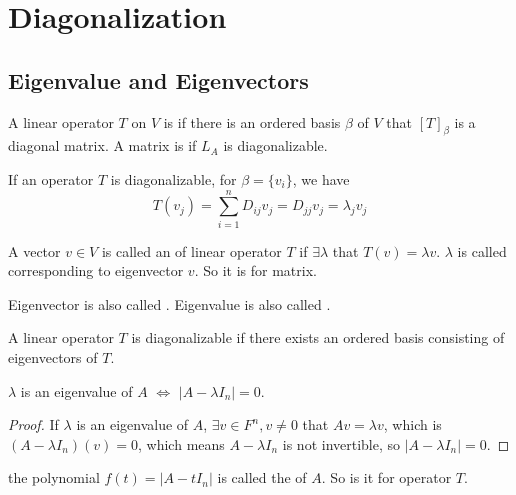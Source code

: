 \section{Diagonalization}

\subsection{Eigenvalue and Eigenvectors}

\begin{definition}
    A linear operator $T$ on $V$ is  if there is an ordered basis $\beta$ of $V$ that $[T]_\beta$ is a diagonal matrix. A matrix is  if $L_A$ is diagonalizable.
\end{definition}

If an operator $T$ is diagonalizable, for $\beta = \{v_i\}$, we have
\begin{equation*}
    T(v_j) = \sum_{i=1}^n D_{ij} v_j = D_{jj} v_j = \lambda_j v_j
\end{equation*}

\begin{definition}
    A vector $v \in V$ is called an  of linear operator $T$ if $\exists \lambda$ that $T(v) = \lambda v$. $\lambda$ is called  corresponding to eigenvector $v$. So it is for matrix.
\end{definition}

Eigenvector is also called . Eigenvalue is also called .

\begin{theorem}
    A linear operator $T$ is diagonalizable if there exists an ordered basis consisting of eigenvectors of $T$.
\end{theorem}

\begin{theorem}
    $\lambda$ is an eigenvalue of $A$ $\iff$ $|A - \lambda I_n| = 0$.
\end{theorem}

\begin{proof}
    If $\lambda$ is an eigenvalue of $A$, $\exists v \in F^n, v \neq 0$ that $A v = \lambda v$, which is $(A - \lambda I_n)(v)= 0$, which means $A - \lambda I_n$ is not invertible, so $|A - \lambda I_n| = 0$.
\end{proof}

\begin{definition}
    the polynomial $f(t) = |A - t I_n|$ is called the  of $A$. So is it for operator $T$.
\end{definition}


